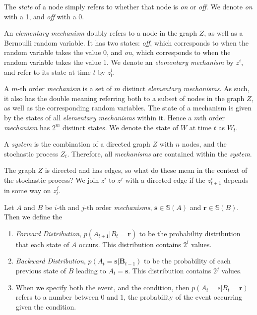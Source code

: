 \begin{definition}
	The \textit{state} of a node simply refers to whether that node is \textit{on} or \textit{off}. We denote \textit{on} with a 1, and \textit{off} with a 0.
\end{definition}

\begin{definition}
	\label{def:element}
	An \textit{elementary mechanism} doubly refers to a node in the graph $Z$, as well as a Bernoulli random variable. It has two states: \textit{off}, which corresponds to when the random variable takes the value 0, and \textit{on}, which corresponds to when the random variable takes the value 1. We denote an \textit{elementary mechanism} by $z^i$, and refer to its state at time $t$ by $z^i_t$.
\end{definition}
	
\begin{definition}
	\label{def:mech}
	A $m$-th order \textit{mechanism} is a set of $m$ distinct \textit{elementary mechanisms}. As such, it also has the double meaning referring both to a subset of nodes in the graph $Z$, as well as the corresponding random variables. The state of a mechanism is given by the states of all \textit{elementary mechanisms} within it. Hence a $m$th order \textit{mechanism} has $2^m$ distinct states. We denote the state of $W$ at time $t$ as $W_t$.
\end{definition}

\begin{definition}
	\label{def:system}
	A \textit{system} is the combination of a directed graph $Z$ with $n$ nodes, and the stochastic process $Z_t$. Therefore, all \textit{mechanisms} are contained within the \textit{system}.
\end{definition}
	
The graph $Z$ is directed and has edges, so what do these mean in the context of the stochastic process? We join $z^i$ to $z^j$ with a directed edge if the $z^i_{t+1}$ depends in some way on $z^j_t$. 

\begin{definition}
	\label{def:distributions}
	Let $A$ and $B$ be $i$-th and $j$-th order \textit{mechanisms}, $\mathbf{s} \in \mathbb{S}(A)$ and $\mathbf{r} \in \mathbb{S}(B)$. Then we define the
	\begin{enumerate}
		\item \textit{Forward Distribution}, $p(A_{t+1}|B_t = \mathbf{r})$ to be the probability distribution that each state of $A$ occurs. This distribution contains $2^i$ values.
		\item \textit{Backward Distribution}, $p(A_{t}=\mathbf{s}|\mathbf{B}_{t-1})$ to be the probability of each previous state of $B$ leading to $A_t = \mathbf{s}$. This distribution contains $2^j$ values.
		\item When we specify both the event, and the condition, then $p(A_t = \mathbb{s}|B_t = \mathbf{r})$ refers to a number between 0 and 1, the probability of the event occurring given the condition.
	\end{enumerate}
\end{definition}



